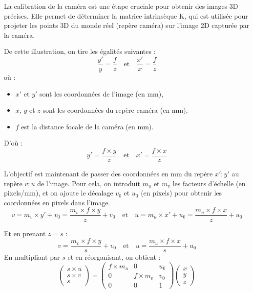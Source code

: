 \documentclass[12pt]{article}
\begin{document}
La calibration de la caméra est une étape cruciale pour obtenir des images 3D précises.
Elle permet de déterminer la matrice intrinsèque K, qui est utilisée pour projeter les points 3D du monde réel (repère caméra) sur l'image 2D capturée par la caméra.


De cette illustration, on tire les égalités suivantes :
\begin{equation}
    \frac{y'}{y} = \frac{f}{z}
    \quad \text{et} \quad \frac{x'}{x} = \frac{f}{z}
\end{equation}
où :
\begin{itemize}
    \item $x'$ et $y'$ sont les coordonnées de l'image (en mm),
    \item $x$, $y$ et $z$ sont les coordonnées du repère caméra (en mm),
    \item $f$ est la distance focale de la caméra  (en mm).
\end{itemize}
\vspace{1cm}

D'où :
\begin{equation}
    y' = \frac{f \times y}{z}
    \quad \text{et} \quad x' = \frac{f \times x}{z}
\end{equation}

L'objectif est maintenant de passer des coordonnées en mm du repère $x';y'$ au repère $v;u$ de l'image.
Pour cela, on introduit $m_u$ et $m_v$ les facteurs d'échelle (en pixels/mm), et on ajoute le décalage $v_{0}$ et $u_{0}$ (en pixels) pour obtenir les coordonnées en pixels dans l'image.
\begin{equation}
    v = m_v \times y' + v_{0} = \frac{m_v \times f \times y}{z} + v_{0}
    \quad \text{et} \quad u = m_u \times x' + u_{0} = \frac{m_u \times f \times x}{z} + u_{0}
\end{equation}

Et en prenant $z = s$ :
\begin{equation}
    v = \frac{m_v \times f \times y}{s} + v_{0}
    \quad \text{et} \quad u = \frac{m_u \times f \times x}{s} + u_{0}
\end{equation}
En multipliant par $s$ et en réorganisant, on obtient :
\begin{equation}
    \begin{pmatrix}
    s \times u \\
    s \times v \\
    s
    \end{pmatrix} = 
    \begin{pmatrix}
    f \times m_{u} & 0 & u_{0} \\
    0 & f \times m_{v} & v_{0} \\
    0 & 0 & 1
    \end{pmatrix}
    \begin{pmatrix}
    x \\
    y \\
    z
    \end{pmatrix}
\end{equation}
\end{document}
